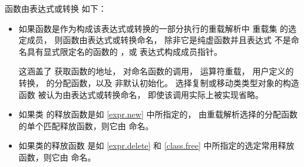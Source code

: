 \pnum
函数由表达式或转换  如下：
\begin{itemize}
\item
  如果函数是作为构成该表达式或转换的一部分执行的重载解析中
  重载集 的选定成员，
  则函数由表达式或转换命名，
  除非它是纯虚函数并且表达式
  不是命名具有显式限定名的函数的 ，或
  表达式构成成员指针。
  \begin{note}
这涵盖了
  获取函数的地址，
  对命名函数的调用，
  运算符重载，
  用户定义的转换，
   的分配函数，以及
  非默认初始化。
  选择复制或移动类类型对象的构造函数
  被认为由表达式或转换命名，
  即使该调用实际上被实现省略。
\end{note}
\item
  如果类
  的释放函数是如 \ref{expr.new} 中所指定的，
  由重载解析选择的分配函数的单个匹配释放函数，则它由  命名。
\item
  如果类的释放函数
  是如 \ref{expr.delete} 和 \ref{class.free} 中所指定的选定常用释放函数，则它由  命名。
\end{itemize}

